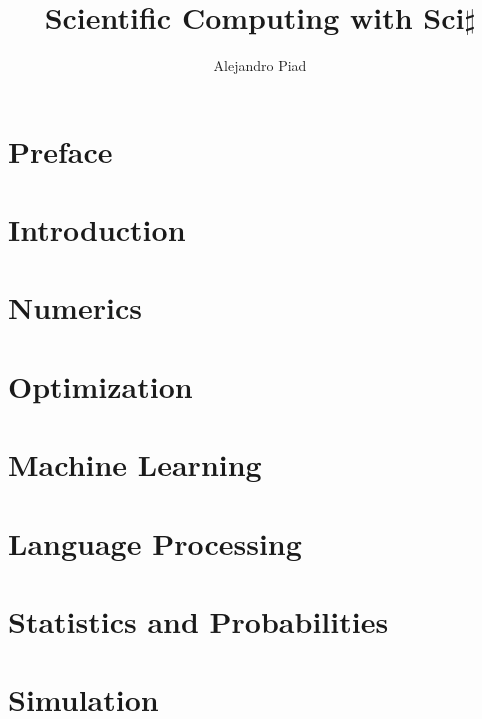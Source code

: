\documentclass[10pt,a4paper]{report}
\author{Alejandro Piad}
\title{\Huge Scientific Computing with Sci$\sharp$}
\begin{document}

\maketitle
\tableofcontents

\chapter*{Preface}
 

\chapter{Introduction}

\chapter{Numerics}

\chapter{Optimization}

\chapter{Machine Learning}

\chapter{Language Processing}
 
 
\chapter{Statistics and Probabilities}

\chapter{Simulation}

\newpage
{}

\begin{small}
 \printindex
\end{small}

\end{document}
